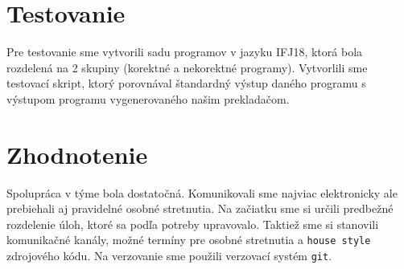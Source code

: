\documentclass[a4paper, 11pt]{article}
\begin{document}
\section{Testovanie}
Pre testovanie sme vytvorili sadu programov v jazyku IFJ18, ktorá bola rozdelená na 2 skupiny (korektné a nekorektné programy). Vytvorlili sme testovací skript, ktorý porovnával štandardný výstup daného programu s výstupom programu vygenerovaného našim prekladačom.
\section{Zhodnotenie}
Spolupráca v týme bola dostatočná. Komunikovali sme najviac elektronicky ale prebiehali aj pravidelné osobné stretnutia. Na začiatku sme si určili predbežné rozdelenie úloh, ktoré sa podľa potreby upravovalo. Taktiež sme si stanovili komunikačné kanály, možné termíny pre osobné stretnutia a \texttt{house style} zdrojového kódu. Na verzovanie sme použili verzovací systém \texttt{git}.
\end{document}
